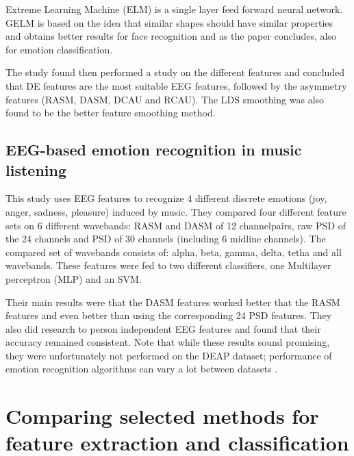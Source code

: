 \npar

Extreme Learning Machine (ELM)  is a single layer feed forward neural network\citep{ELMpaper}. GELM is based on the idea that similar shapes should have similar properties and obtains better results for face recognition\citep{GELMpaper} and as the paper concludes, also for emotion classification.

\npar

The study found then performed a study on the different features and concluded that DE features are the most suitable EEG features, followed by the asymmetry features (RASM, DASM, DCAU and RCAU). The LDS smoothing was also found to be the better feature smoothing method. 

\subsection{EEG-based emotion recognition in music listening}

This study\citep{emorecoghard} uses EEG features to recognize 4 different discrete emotions (joy, anger, sadness, pleasure) induced by music. They compared four different feature sets on 6 different wavebands: RASM and DASM of 12 channelpairs, raw PSD of the 24 channels and PSD of 30 channels (including 6 midline channels). The compared set of wavebands consists of: alpha, beta, gamma, delta, tetha and all wavebands. These features were fed to two different classifiers, one Multilayer perceptron (MLP)  and an SVM. 

\npar

Their main results were that the DASM features worked better that the RASM features and even better than using the corresponding 24 PSD features. They also did research to person independent EEG features and found that their accuracy remained consistent. Note that while these results sound promising, they were unfortunately not performed on the DEAP dataset; performance of emotion recognition algorithms can vary a lot between datasets \citep{PhytoEm}.

\section{Comparing selected methods for feature extraction and classification}

